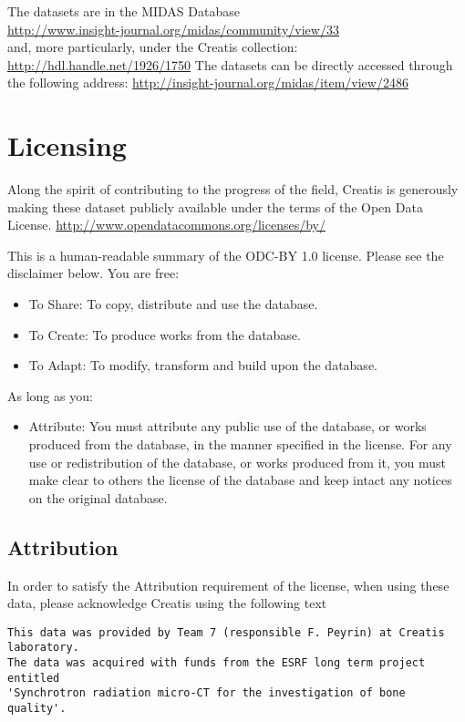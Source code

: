 \documentclass{InsightArticle}
\begin{document}
The datasets are in the MIDAS Database\\
\url{http://www.insight-journal.org/midas/community/view/33} \\
and, more particularly, under the Creatis collection:
\url{http://hdl.handle.net/1926/1750}
The datasets can be directly accessed through the following address:
\url{http://insight-journal.org/midas/item/view/2486}

\section{Licensing}

Along the spirit of contributing to the progress of the field, Creatis is
generously making these dataset publicly available under the terms of the Open
Data License.
\url{http://www.opendatacommons.org/licenses/by/}

This is a human-readable summary of the ODC-BY 1.0 license. Please see the disclaimer below.
You are free:\\

\begin{itemize}
\item To Share: To copy, distribute and use the database.
\item To Create: To produce works from the database.
\item To Adapt: To modify, transform and build upon the database.
\end{itemize}

As long as you:\\

\begin{itemize}
\item Attribute: You must attribute any public use of the database, or works
produced from the database, in the manner specified in the license. For any use
or redistribution of the database, or works produced from it, you must make
clear to others the license of the database and keep intact any notices on the
original database.
\end{itemize}


\subsection{Attribution}

In order to satisfy the Attribution requirement of the license, when using
these data, please acknowledge Creatis using the following text

\begin{verbatim}
This data was provided by Team 7 (responsible F. Peyrin) at Creatis laboratory.
The data was acquired with funds from the ESRF long term project entitled
'Synchrotron radiation micro-CT for the investigation of bone quality'.
\end{verbatim}
\end{document}
